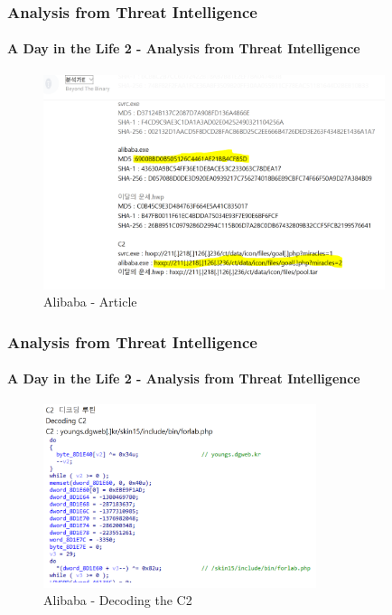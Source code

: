 \documentclass[aspectratio=169]{beamer}
\begin{document}
\begin{frame}
  \frametitle{Analysis from Threat Intelligence}
  \framesubtitle{A Day in the Life 2 - Analysis from Threat Intelligence}
  \begin{center}
    \begin{figure}
    \includegraphics[width=10cm,keepaspectratio]{alibaba_article_0}
    \caption{Alibaba - Article}
    \end{figure}
  \end{center}
\end{frame}

\begin{frame}
  \frametitle{Analysis from Threat Intelligence}
  \framesubtitle{A Day in the Life 2 - Analysis from Threat Intelligence}
  \begin{center}
    \begin{figure}
    \includegraphics[width=8cm,keepaspectratio]{alibaba_article_1}
    \caption{Alibaba - Decoding the C2}
    \end{figure}
  \end{center}
\end{frame}
\end{document}
